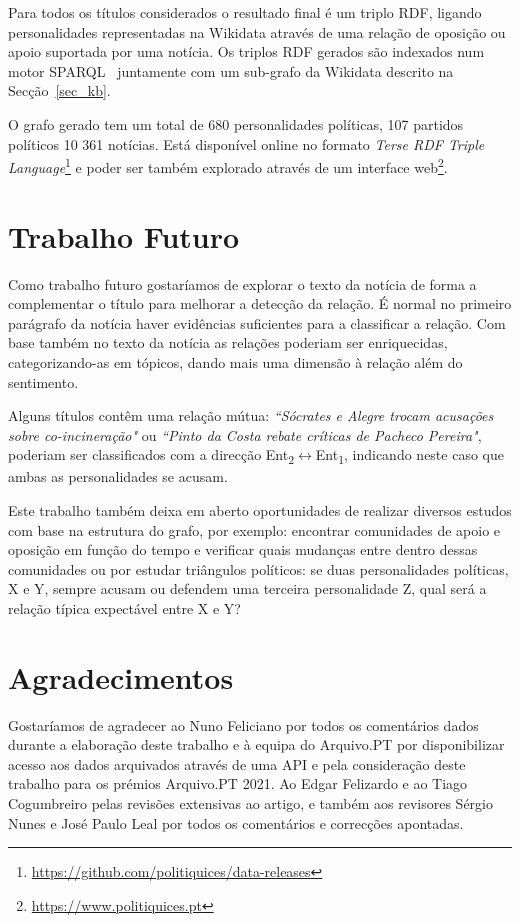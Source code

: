 \documentclass[a4paper, twocolumn, 11pt, twoside]{article}
\begin{document}
Para todos os títulos considerados o resultado final é um triplo RDF, ligando personalidades representadas na Wikidata através de uma relação de oposição ou apoio suportada por uma notícia. Os triplos RDF gerados são indexados num motor SPARQL~\citep{jena2015free} juntamente com um sub-grafo da Wikidata descrito na Secção~\ref{sec_kb}.

O grafo gerado tem um total de 680 personalidades políticas, 107 partidos políticos 10 361 notícias. Está disponível online no formato \textit{Terse RDF Triple Language}\footnote{\url{https://github.com/politiquices/data-releases}} e poder ser também explorado através de um interface web\footnote{\url{https://www.politiquices.pt}}.

\section{Trabalho Futuro}
\label{sec:future_work}

Como trabalho futuro gostaríamos de explorar o texto da notícia de forma a complementar o título para melhorar a detecção da relação. É normal no primeiro parágrafo da notícia haver evidências suficientes para a classificar a relação. Com base também no texto da notícia as relações poderiam ser enriquecidas, categorizando-as em tópicos, dando mais uma dimensão à relação além do sentimento.

Alguns títulos contêm uma relação mútua: \textit{``Sócrates e Alegre trocam acusações sobre co-incineração"} ou \textit{``Pinto da Costa rebate críticas de Pacheco Pereira"}, poderiam ser classificados com a direcção Ent\textsubscript{2}$\leftrightarrow$Ent\textsubscript{1}, indicando neste caso que ambas as personalidades se acusam.

Este trabalho também deixa em aberto oportunidades de realizar diversos estudos com base na estrutura do grafo, por exemplo: encontrar comunidades de apoio e oposição em função do tempo e verificar quais mudanças entre dentro dessas comunidades ou por estudar triângulos políticos: se duas personalidades políticas, X e Y, sempre acusam ou defendem uma terceira personalidade Z, qual será a relação típica expectável entre X e Y?

\section*{Agradecimentos}

Gostaríamos de agradecer ao Nuno Feliciano por todos os comentários dados durante a elaboração deste trabalho e à equipa do Arquivo.PT por disponibilizar acesso aos dados arquivados através de uma API e pela consideração deste trabalho para os prémios Arquivo.PT 2021. Ao Edgar Felizardo e ao Tiago Cogumbreiro pelas revisões extensivas ao artigo, e também aos revisores Sérgio Nunes e José Paulo Leal por todos os comentários e correcções apontadas.


\end{document}
